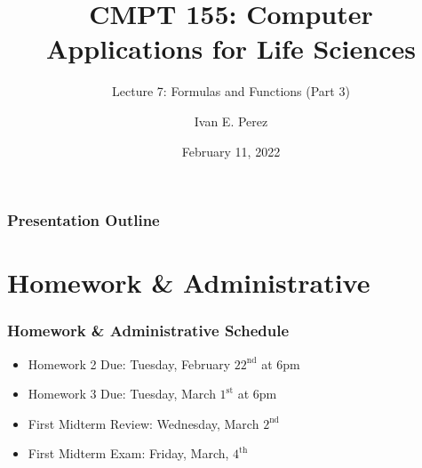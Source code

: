 \documentclass[12pt]{beamer}
\title{CMPT 155: Computer Applications for Life Sciences}
\subtitle{Lecture 7: Formulas and Functions (Part 3)}
\author{Ivan E. Perez}
\institute{}
\date{February 11, 2022}
\begin{document}
	
	\begin{frame}
		\titlepage
	\end{frame}
	
	\begin{frame}
		\frametitle{Presentation Outline}
		\tableofcontents
	\end{frame}
	\section{Homework \& Administrative}
	
	\begin{frame}
		\frametitle{Homework \& Administrative Schedule}
		\begin{itemize}
			\item Homework 2 Due: Tuesday, February $22^{\text{nd}}$ at 6pm
			\item Homework 3 Due: Tuesday, March $1^{\text{st}}$ at 6pm
			\item First Midterm Review:  Wednesday, March $2^{\text{nd}}$
			\item First Midterm Exam: Friday, March, $4^{\text{th}}$
			
		\end{itemize}
	\end{frame}
\end{document}
